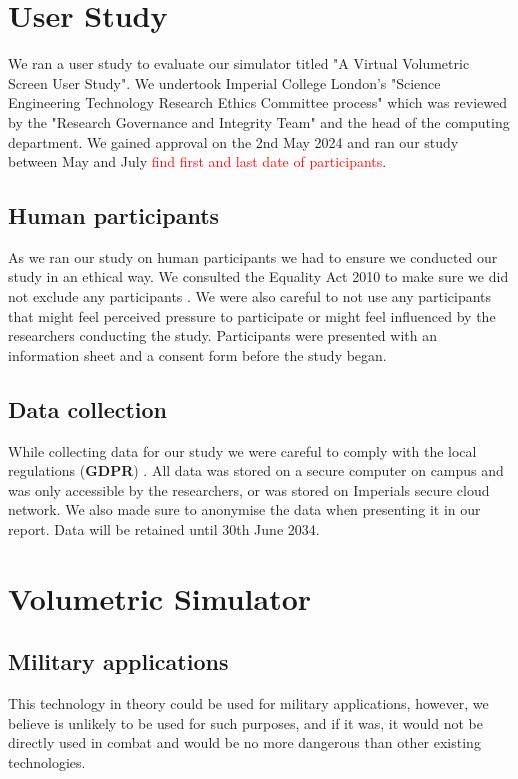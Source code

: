 \section{User Study}
We ran a user study to evaluate our simulator titled "A Virtual Volumetric Screen User Study". We undertook Imperial College London's "Science Engineering Technology Research Ethics Committee process" which was reviewed by the "Research Governance and Integrity Team" and the head of the computing department. We gained approval on the 2nd May 2024 and ran our study between May and July \textcolor{red}{find first and last date of participants}. 

\subsection{Human participants}
As we ran our study on human participants we had to ensure we conducted our study in an ethical way. We consulted the Equality Act 2010 to make sure we did not exclude any participants \tocite. We were also careful to not use any participants that might feel perceived pressure to participate or might feel influenced by the researchers conducting the study. Participants were presented with an information sheet and a consent form before the study began.   

\subsection{Data collection}
While collecting data for our study we were careful to comply with the local regulations (\textbf{GDPR}) \tocite. All data was stored on a secure computer on campus and was only accessible by the researchers, or was stored on Imperials secure cloud network. We also made sure to anonymise the data when presenting it in our report. Data will be retained until 30th June 2034.

\section{Volumetric Simulator}
\subsection{Military applications}
This technology in theory could be used for military applications, however, we believe is unlikely to be used for such purposes, and if it was, it would not be directly used in combat and would be no more dangerous than other existing technologies.

